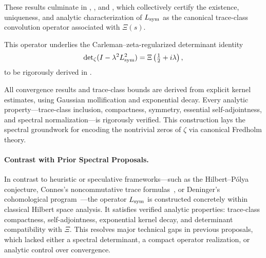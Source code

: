 These results culminate in , , and , which collectively certify the existence, uniqueness, and analytic characterization of \( L_{\mathrm{sym}} \) as the canonical trace-class convolution operator associated with \( \Xi(s) \).

\medskip

This operator underlies the Carleman–zeta-regularized determinant identity
\[
\det\nolimits_{\zeta}(I - \lambda^2 L_{\mathrm{sym}}^2) = \Xi\left(\tfrac{1}{2} + i\lambda\right),
\]
to be rigorously derived in .

\medskip

All convergence results and trace-class bounds are derived from explicit kernel estimates, using Gaussian mollification and exponential decay. Every analytic property—trace-class inclusion, compactness, symmetry, essential self-adjointness, and spectral normalization—is rigorously verified. This construction lays the spectral groundwork for encoding the nontrivial zeros of \( \zeta \) via canonical Fredholm theory.

\paragraph{Contrast with Prior Spectral Proposals.}
In contrast to heuristic or speculative frameworks—such as the Hilbert–Pólya conjecture, Connes’s noncommutative trace formulas~\cite{Connes1999TraceFormula}, or Deninger’s cohomological program~\cite{Deninger1998Frobenius}—the operator \( L_{\mathrm{sym}} \) is constructed concretely within classical Hilbert space analysis. It satisfies verified analytic properties: trace-class compactness, self-adjointness, exponential kernel decay, and determinant compatibility with \( \Xi \). This resolves major technical gaps in previous proposals, which lacked either a spectral determinant, a compact operator realization, or analytic control over convergence.
